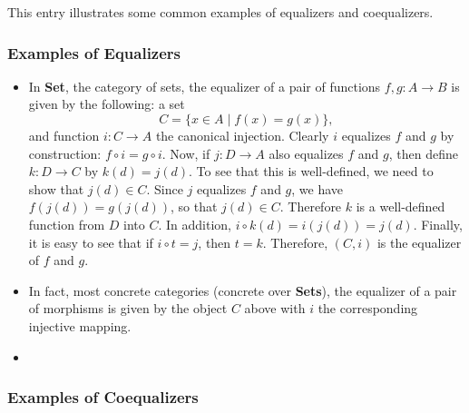 \documentclass[12pt]{article}
\begin{document}
This entry illustrates some common examples of equalizers and coequalizers.

\subsubsection*{Examples of Equalizers}

\begin{itemize}
\item In \textbf{Set}, the category of sets, the equalizer of a pair of functions $f,g:A\to B$ is given by the following: a set $$C=\lbrace x\in A\mid f(x)=g(x)\rbrace,$$ and function $i:C\to A$ the canonical injection.  Clearly $i$ equalizes $f$ and $g$ by construction: $f\circ i = g\circ i$.  Now, if $j:D\to A$ also equalizes $f$ and $g$, then define $k:D\to C$ by $k(d)=j(d)$.  To see that this is well-defined, we need to show that $j(d)\in C$.  Since $j$ equalizes $f$ and $g$, we have $f(j(d))=g(j(d))$, so that $j(d)\in C$.  Therefore $k$ is a well-defined function from $D$ into $C$.  In addition, $i\circ k(d)=i(j(d))=j(d)$.  Finally, it is easy to see that if $i\circ t=j$, then $t=k$.  Therefore, $(C,i)$ is the equalizer of $f$ and $g$.
\item In fact, most concrete categories (concrete over \textbf{Sets}), the equalizer of a pair of morphisms is given by the object $C$ above with $i$ the corresponding injective mapping.
\item 
\end{itemize}

\subsubsection*{Examples of Coequalizers}
\end{document}
